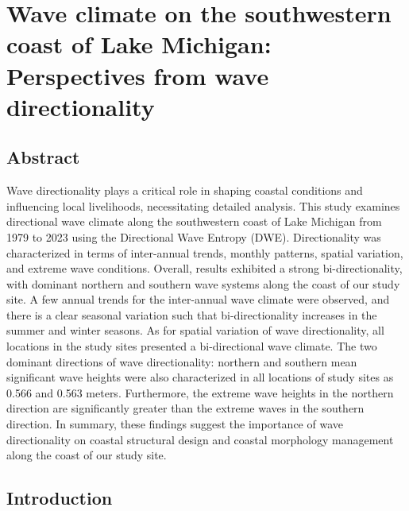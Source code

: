 \chapter{Wave climate on the southwestern coast of Lake Michigan: Perspectives from wave directionality}
\label{chapter3}

\section{Abstract}
\label{c3_Abstract}
Wave directionality plays a critical role in shaping coastal conditions and
influencing local livelihoods, necessitating detailed analysis. This study
examines directional wave climate along the southwestern coast of Lake Michigan
from 1979 to 2023 using the Directional Wave Entropy (DWE). Directionality was
characterized in terms of inter-annual trends, monthly patterns, spatial
variation, and extreme wave conditions. Overall, results exhibited a strong
bi-directionality, with dominant northern and southern wave systems along the
coast of our study site. A few annual trends for the inter-annual wave climate
were observed, and there is a clear seasonal variation such that
bi-directionality increases in the summer and winter seasons. As for spatial
variation of wave directionality, all locations in the study sites presented a
bi-directional wave climate. The two dominant directions of wave directionality:
northern and southern mean significant wave heights were also characterized in
all locations of study sites as 0.566 and 0.563 meters. Furthermore, the extreme
wave heights in the northern direction are significantly greater than the
extreme waves in the southern direction. In summary, these findings suggest the
importance of wave directionality on coastal structural design and coastal
morphology management along the coast of our study site. 

\section{Introduction}
\label{c3_Introduction}

